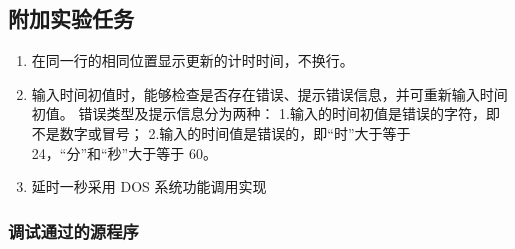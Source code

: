 \documentclass[12pt, a4paper, oneside]{ctexart}
\begin{document}
\subsection{附加实验任务}
\begin{enumerate}
    \item 在同一行的相同位置显示更新的计时时间，不换行。
    \item 输入时间初值时，能够检查是否存在错误、提示错误信息，并可重新输入时间初值。
    错误类型及提示信息分为两种：
    1.输入的时间初值是错误的字符，即不是数字或冒号；
    2.输入的时间值是错误的，即“时”大于等于 24，“分”和“秒”大于等于 60。
    \item 延时一秒采用 DOS 系统功能调用实现
\end{enumerate}
\subsubsection{调试通过的源程序}
\end{document}
